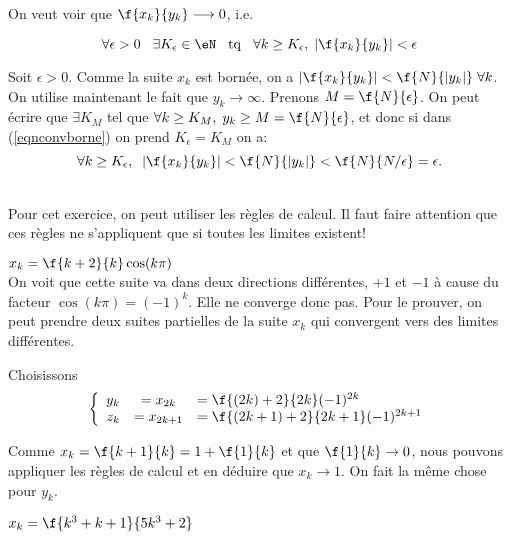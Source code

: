 \noindent On veut voir que $\f{x_k}{y_k}\longrightarrow 0$, i.e.

\begin{equation}
\label{eqnconvborne}  \forall  \epsilon > 0 \hspace{0.3cm} \exists K_\epsilon \in \eN \hspace{0.3cm} {\rm tq} \hspace{0.3cm} \forall k \geq K_\epsilon, \; |\f{x_k}{y_k}| < \epsilon \end{equation}

\noindent Soit $\epsilon >0$. Comme la suite $x_k$ est bornée, on a $|\f{x_k}{y_k}|<\f{N}{|y_k|}\; \forall k$. On utilise maintenant le fait que $y_k \longrightarrow \infty$. Prenons $M=\f{N}{\epsilon}$. On peut écrire que $\exists K_M$ tel que $\forall k \geq K_M, \; y_k \geq M=\f{N}{\epsilon}$, et donc si dans (\ref{eqnconvborne}) on prend $K_\epsilon= K_M$ on a:\[\forall k \geq K_\epsilon,\; \; |\f{x_k}{y_k}|<\f{N}{|y_k|}<\f{N}{N/\epsilon}=\epsilon.\]



\\

\noindent Pour cet exercice, on peut utiliser les règles de calcul. Il faut faire attention que ces règles ne s'appliquent que si toutes les limites existent!

\vspace{0.5cm}
 $x_k = \f{k+2}{k}\cos(k\pi)$\\

\noindent On voit que cette suite va dans deux directions différentes, $+1$ et $-1$ à cause du facteur $\cos(k\pi)=(-1)^k$. Elle ne converge donc pas. Pour le prouver, on peut prendre deux suites partielles de la suite $x_k$ qui convergent vers des limites différentes.

\noindent Choisissons \[\left\{ \begin{array}{rcl} y_k &= x_{2k}&= \f{(2k)+2}{2k}(-1)^{2k}\\
 							  z_k &= x_{2k+1} &= \f{(2k+1)+2}{2k+1} (-1)^{2k+1}\end{array}\right.\]

\noindent Comme $x_k =\f{k+1}{k}= 1+\f{1}{k}$	et que $\f{1}{k} \rightarrow  0$, nous pouvons appliquer les règles de calcul et en déduire que $x_k \rightarrow  1$. On fait la même chose pour $y_k$.


\vspace{0.5cm}
 $x_k = \f{k^3+k+1}{5k^3+2}$\\

